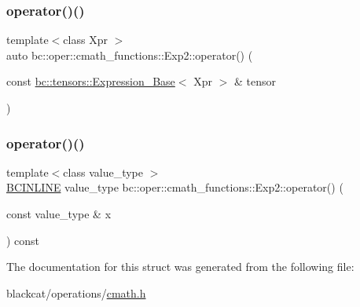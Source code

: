 \mbox{\label{structbc_1_1oper_1_1cmath__functions_1_1Exp2_a70896393943a5aff6211e50e2f97ed01}} 
\subsubsection{\texorpdfstring{operator()()}{operator()()}\hspace{0.1cm}{\footnotesize\ttfamily [2/3]}}
{\footnotesize\ttfamily template$<$class Xpr $>$ \\
auto bc\+::oper\+::cmath\+\_\+functions\+::\+Exp2\+::operator() (\begin{DoxyParamCaption}\item[{const \hyperlink{classbc_1_1tensors_1_1Expression__Base}{bc\+::tensors\+::\+Expression\+\_\+\+Base}$<$ Xpr $>$ \&}]{tensor }\end{DoxyParamCaption})\hspace{0.3cm}{\ttfamily [inline]}}

\mbox{\label{structbc_1_1oper_1_1cmath__functions_1_1Exp2_a4598fc4ff3324735593095d360c802d1}} 
\subsubsection{\texorpdfstring{operator()()}{operator()()}\hspace{0.1cm}{\footnotesize\ttfamily [3/3]}}
{\footnotesize\ttfamily template$<$class value\+\_\+type $>$ \\
\hyperlink{common_8h_a6699e8b0449da5c0fafb878e59c1d4b1}{B\+C\+I\+N\+L\+I\+NE} value\+\_\+type bc\+::oper\+::cmath\+\_\+functions\+::\+Exp2\+::operator() (\begin{DoxyParamCaption}\item[{const value\+\_\+type \&}]{x }\end{DoxyParamCaption}) const\hspace{0.3cm}{\ttfamily [inline]}}



The documentation for this struct was generated from the following file\+:\begin{DoxyCompactItemize}
\item 
blackcat/operations/\hyperlink{cmath_8h}{cmath.\+h}\end{DoxyCompactItemize}

